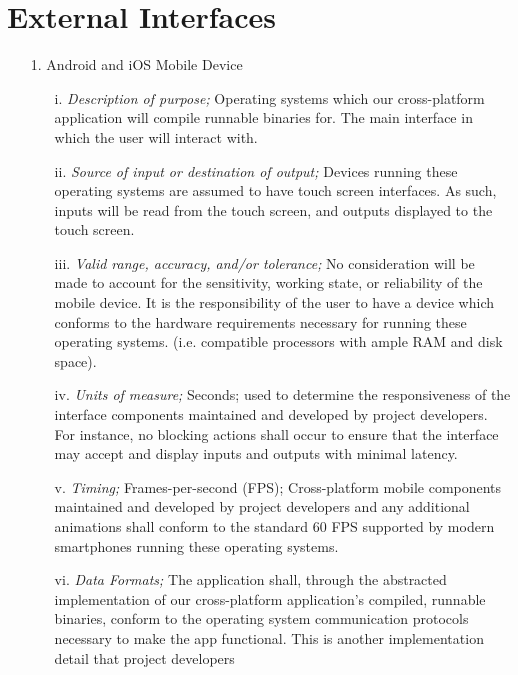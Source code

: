 \documentclass{scrreprt}
\begin{document}
\section{External Interfaces}
\begin{enumerate}
	\item[1.] Android and iOS Mobile Device
	\begin{itemize}
		\item[i.] \textit{Description of purpose;} Operating systems which our cross-platform application will compile runnable binaries for. The main interface in which the user will interact with.
		\item[ii.] \textit{Source of input or destination of output;} Devices running these operating systems are assumed to have touch screen interfaces. As such, inputs will be read from the touch screen, and outputs displayed to the touch screen.
		\item[iii.] \textit{Valid range, accuracy, and/or tolerance;} No consideration will be made to account for the sensitivity, working state, or reliability of the mobile device. It is the responsibility of the user to have a device which conforms to the hardware requirements necessary for running these operating systems. (i.e. compatible processors with ample RAM and disk space).
		\item[iv.] \textit{Units of measure;} Seconds; used to determine the responsiveness of the interface components maintained and developed by project developers. For instance, no blocking actions shall occur to ensure that the interface may accept and display inputs and outputs with minimal latency.
		\item[v.] \textit{Timing;} Frames-per-second (FPS); Cross-platform mobile components maintained and developed by project developers and any additional animations shall conform to the standard 60 FPS supported by modern smartphones running these operating systems.
		\item[vi.] \textit{Data Formats;} The application shall, through the abstracted implementation of our cross-platform application's compiled, runnable binaries, conform to the operating system communication protocols necessary to make the app functional. This is another implementation detail that project developers
	\end{itemize}
	

\end{enumerate}
\end{document}
